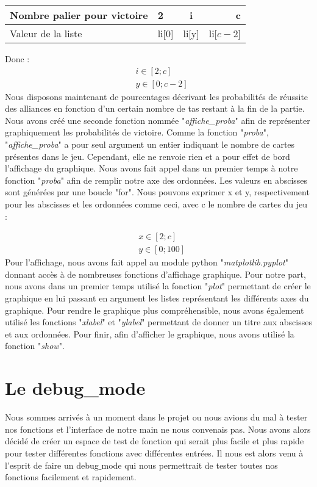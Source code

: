 \documentclass[10pt,a4paper,french,titlepage]{article}
\theoremstyle{definition}
\begin{document}
\begin{center}
\begin{tabular}{|p{3cm}|l|c|r|}
  \hline
  Nombre palier pour victoire & 2 & i & c\\
  \hline
  Valeur de la liste & li[0] & li[y] & li[$c-2$] \\
  \hline
\end{tabular}
\end{center}
Donc :
\begin{align*}
&i \in [2;c]\\
&y \in [0;c-2]
\end{align*}
Nous disposons maintenant de pourcentages décrivant les probabilités de réussite des alliances en fonction d'un certain nombre de tas restant à la fin de la partie. Nous avons créé une seconde fonction nommée "\textit{affiche\_proba}" afin de représenter graphiquement les probabilités de victoire. Comme la fonction "\textit{proba}", "\textit{affiche\_proba}" a pour seul argument un entier indiquant le nombre de cartes présentes dans le jeu. Cependant, elle ne renvoie rien et a pour effet de bord l'affichage du graphique. Nous avons fait appel dans un premier temps à notre fonction "\textit{proba}" afin de remplir notre axe des ordonnées. Les valeurs en abscisses sont générées par une boucle
"for". Nous pouvons exprimer x et y, respectivement pour les abscisses et les ordonnées comme ceci, avec c le nombre de cartes du jeu :

\begin{align*}
&x \in [2;c] \\
&y \in [0;100]
\end{align*}
Pour l'affichage, nous avons fait appel au module python "\textit{matplotlib.pyplot}" donnant accès à de nombreuses fonctions d'affichage graphique. Pour notre part, nous avons dans un premier temps utilisé la fonction "\textit{plot}" permettant de créer le graphique en lui passant en argument les listes représentant les différents axes du graphique. Pour rendre le graphique plus compréhensible, nous avons également utilisé les fonctions "\textit{xlabel}" et "\textit{ylabel}" permettant de donner un titre aux abscisses et aux ordonnées. Pour finir, afin d'afficher le graphique, nous avons utilisé la fonction "\textit{show}".

\section{Le debug\_mode}
Nous sommes arrivés à un moment dans le projet ou nous avions du mal à tester nos fonctions et l’interface de notre main ne nous convenais pas. Nous avons alors décidé de créer un espace de test de fonction qui serait plus facile et plus rapide pour tester différentes fonctions avec différentes entrées. Il nous est alors venu à l’esprit de faire un debug$\_$mode qui nous permettrait de tester toutes nos fonctions facilement et rapidement.
\end{document}
